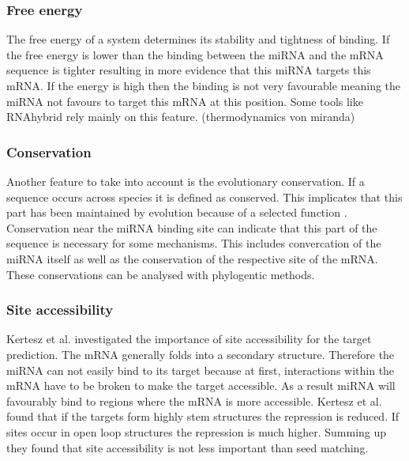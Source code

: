 \documentclass[12pt]{article}
\begin{document}
\subsubsection{Free energy}
The free energy of a system determines its stability and tightness of binding. If the free energy is lower than the binding between the miRNA and the mRNA sequence is tighter resulting in more evidence that this miRNA targets this mRNA. If the energy is high then the binding is not very favourable meaning the miRNA not favours to target this mRNA at this position. Some tools like RNAhybrid \cite{Rehmsmeier} rely mainly on this feature. (thermodynamics von miranda)
 
\subsubsection{Conservation}
Another feature to take into account is the evolutionary conservation. If a sequence occurs across species it is defined as conserved. This implicates that this part has been maintained by evolution because of a selected function \cite{Peterson}. Conservation near the miRNA binding site can indicate that this part of the sequence is necessary for some mechanisms. This includes convercation of the miRNA itself as well as the conservation of the respective site of the mRNA. These conservations can be analysed with phylogentic methods.


\subsubsection{Site accessibility}
Kertesz et al. \cite{Kertesz} investigated the importance of site accessibility for the target prediction. The mRNA generally folds into a secondary structure. Therefore the miRNA can not easily bind to its target because at first, interactions within the mRNA have to be broken to make the target accessible. As a result miRNA will favourably bind to regions where the mRNA is more accessible. Kertesz et al. \cite{Kertesz} found that if the targets form highly stem structures the repression is reduced. If sites occur in open loop structures the repression is much higher. Summing up they found that site accessibility is not less important than seed matching. \\
\end{document}
